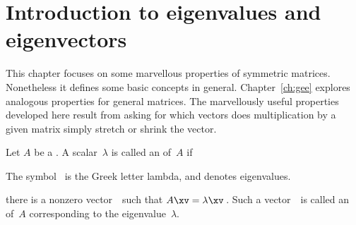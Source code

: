 

\section{Introduction to eigenvalues and eigenvectors}
\label{sec:iee}
\secttoc

\begin{comment}
\pooliv{\S4.1} \layiv{\S5.1} \holti{\S6.1}  \cite[Ch.~8, 11]{Chartier2015}
\end{comment}


This chapter focuses on some marvellous properties of symmetric matrices.  
Nonetheless it defines some basic concepts in general.  
Chapter~\ref{ch:gee} explores analogous properties for general matrices.
The marvellously useful properties developed here result from asking for which vectors does multiplication by a given matrix simply stretch or shrink the vector.


\begin{definition} \label{def:evecval}
Let \(A\) be a .  
A scalar~\(\lambda\) is called an  of~\(A\) if 
\begin{aside}
The symbol~\idx{$\lambda$} is the Greek letter lambda, and denotes eigenvalues.
\end{aside}%
there is a nonzero vector~\xv\ such that \(A\xv=\lambda\xv\)\,. 
Such a vector~\xv\ is called an  of~\(A\) corresponding to the eigenvalue~\(\lambda\).   
\end{definition}



